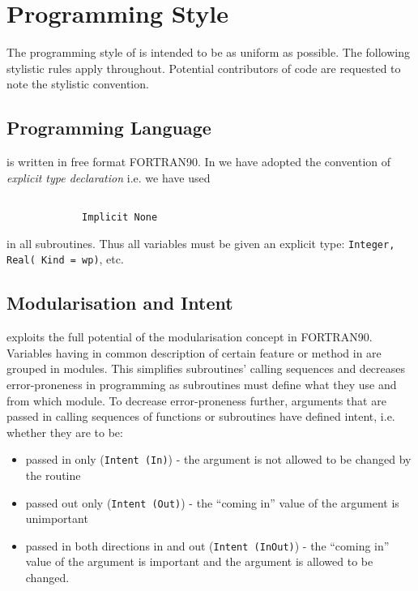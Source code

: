 \section{Programming Style}

The programming style of \D is intended to be as uniform as
possible.  The following stylistic rules apply throughout.
Potential contributors of code are requested to note the stylistic
convention.

\subsection{Programming Language}

\D is written in free format FORTRAN90.  In \D
we have adopted the convention of {\em explicit type declaration}
i.e. we have used
\begin{verbatim}

             Implicit None

\end{verbatim}
in all subroutines.  Thus all variables must be given an explicit
type: {\tt Integer, Real( Kind = wp)}, etc.

\subsection{Modularisation and Intent}

\D exploits the full potential of the modularisation concept in
FORTRAN90.  Variables having in common description of certain
feature or method in \D are grouped in modules.  This simplifies
subroutines' calling sequences and decreases error-proneness in
programming as subroutines must define what they use and from
which module.  To decrease error-proneness further, arguments that
are passed in calling sequences of functions or subroutines have
defined intent, i.e. whether they are to be:
\begin{itemize}
\item passed in only ({\tt Intent (In)}) - the argument is not
allowed to be changed by the routine
\item passed out only ({\tt Intent (Out)}) - the ``coming in''
value of the argument is unimportant
\item passed in both directions in and out ({\tt Intent (InOut)})
- the ``coming in'' value of the argument is important and the
argument is allowed to be changed.
\end{itemize}

